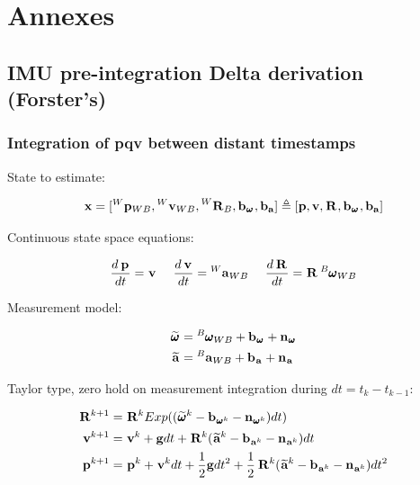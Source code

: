 \documentclass[11pt]{article}
\newcommand{\Rot}[2]{\prescript{#1}{}{\bfR}_{#2}}
\newcommand{\noise}{\bfn}
\newcommand{\posi}[2]{\prescript{#1}{}{\bfp}_{#2}}
\newcommand{\vel}[2]{\prescript{#1}{}{\bfv}_{#2}}
\newcommand{\acc}[2]{\prescript{#1}{}{\bfa}_{#2}}
\newcommand{\accm}[2]{\prescript{#1}{}{\widetilde{\bfa}}_{#2}}
\newcommand{\angvel}[2]{\prescript{#1}{}{\pmb{\omega}}_{#2}}
\newcommand{\angvelm}[2]{\prescript{#1}{}{\widetilde{\pmb{\omega}}}_{#2}}
\newcommand{\grav}{\bfg}
\begin{document}
\section{Annexes}
\subsection{IMU pre-integration Delta derivation (Forster's)}
\subsubsection{Integration of pqv between distant timestamps}
State to estimate:

\begin{equation*}
\bfx = [\posi{W}{WB}, \vel{W}{WB}, \Rot{W}{B}, \bfb_{\angvel{}{}}, \bfb_{\bfa}]
\triangleq 
[\bfp, \bfv, \Rot{}{}, \bfb_{\angvel{}{}}, \bfb_{\bfa}] 
\end{equation*}

Continuous state space equations:

\begin{equation*}
\frac{d\posi{}{}}{dt} = \vel{}{}  ~~~~ \frac{d\vel{}{}}{dt} = \acc{W}{WB} ~~~~ \frac{d\Rot{}{}}{dt} = \Rot{}{} \angvel{B}{WB} 
\end{equation*}

Measurement model:

\begin{equation*}
\begin{split}
\angvelm{}{} &= \angvel{B}{WB} + \bfb_{\angvel{}{}} + \noise_{\angvel{}{}} 
\\
\accm{}{}    &= \acc{B}{WB} + \bfb_{\acc{}{}} + \noise_{\acc{}{}} 
\end{split}
\end{equation*}


Taylor type, zero hold on measurement integration during $dt = t_k - t_{k-1}$:

\begin{equation*}
\begin{split}
\Rot{}{}^{k+1}  &= \Rot{}{}^{k}Exp((\angvelm{}{}^k - \bfb_{\angvel{}{}^k} - \noise_{\angvel{}{}^k})dt)
\\
\vel{}{}^{k+1}  &= \vel{}{}^{k} + \grav dt + \Rot{}{}^{k}(\accm{}{}^k - \bfb_{\acc{}{}^k} - \noise_{\acc{}{}^k})dt
\\
\posi{}{}^{k+1} &= \posi{}{}^{k} + \vel{}{}^{k}dt + \frac{1}{2}\grav dt^2 
+ \frac{1}{2}\Rot{}{}^{k}(\accm{}{}^k - \bfb_{\acc{}{}^k} - \noise_{\acc{}{}^k})dt^2
\end{split}
\end{equation*}
\end{document}
